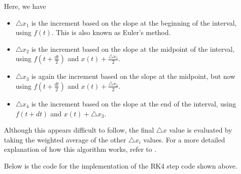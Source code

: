 \documentclass[12pt]{article} %
\begin{document}
Here, we have 

\begin{itemize}
	\item $\triangle x_1$	is the increment based on the slope at the beginning of the interval, using  $f(t)$. This is also known as Euler's method.	
	\item $\triangle x_2$ is the increment based on the slope at the midpoint of the interval, using   $f(t + \frac{dt}{2})$ and $x(t) + \frac{\triangle x_1}{2}$.
	\item	$\triangle x_3$ is again the increment based on the slope at the midpoint, but now using     $f(t + \frac{dt}{2})$ and $x(t) + \frac{\triangle x_2}{2}$.
	\item	$\triangle x_4$ is the increment based on the slope at the end of the interval, using        $f(t + dt)$ and $x(t)+\triangle x_3$.	
\end{itemize}



Although this appears difficult to follow, the final $\triangle x$ value is evaluated by taking the weighted average of the other $\triangle x_i$ values. For a more detailed explanation of how this algorithm works, refer to \cite{OldRunge}.\\


\pagebreak


\lstset{style=mystyle}


Below is the code for the implementation of the RK4 step code shown above. 



\end{document}
